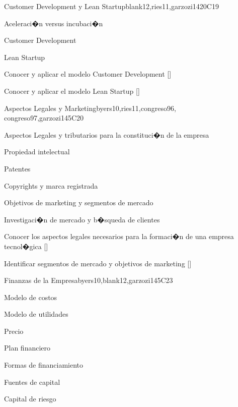 \begin{syllabus}
\begin{unit}{}{Customer Development y Lean Startup}{blank12,ries11,garzozi14}{20}{C19}
	\begin{topics}
      \item Aceleraci�n versus incubaci�n  
      \item Customer Development
      \item Lean Startup 
   \end{topics}

   \begin{learningoutcomes} 
      \item Conocer y aplicar el modelo Customer Development  [\Usage]
      \item Conocer y aplicar el modelo Lean Startup  [\Usage]
    \end{learningoutcomes} 
\end{unit}

\begin{unit}{}{Aspectos Legales y Marketing}{byers10,ries11,congreso96, congreso97,garzozi14}{5}{C20}
	\begin{topics}
	  \item Aspectos Legales y tributarios para la constituci�n de la empresa
      \item Propiedad intelectual
      \item Patentes
      \item Copyrights y marca registrada
      \item Objetivos de marketing  y segmentos de mercado
      \item Investigaci�n de mercado y b�squeda de clientes
   \end{topics}

  \begin{learningoutcomes} 
      \item Conocer los aspectos legales necesarios para la formaci�n de una empresa tecnol�gica  [\Familiarity]
      \item Identificar segmentos de mercado y objetivos de marketing     [\Familiarity]
   \end{learningoutcomes} 
\end{unit}

\begin{unit}{}{Finanzas de la Empresa}{byers10,blank12,garzozi14}{5}{C23}
	\begin{topics}
      \item Modelo de costos
      \item Modelo de utilidades
      \item Precio
      \item Plan financiero
      \item Formas de financiamiento
      \item Fuentes de capital
      \item Capital de riesgo
   \end{topics}


\end{unit}
\end{syllabus}
